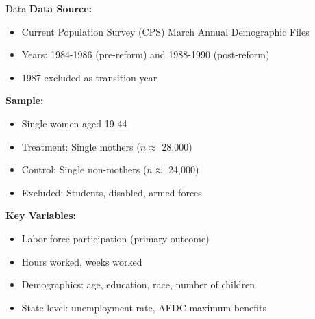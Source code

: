 \documentclass[aspectratio=169]{beamer}
\begin{document}
\begin{frame}{Data}
\textbf{Data Source:}
\begin{itemize}
    \item Current Population Survey (CPS) March Annual Demographic Files
    \item Years: 1984-1986 (pre-reform) and 1988-1990 (post-reform)
    \item 1987 excluded as transition year
\end{itemize}

\vspace{0.3cm}
\textbf{Sample:}
\begin{itemize}
    \item Single women aged 19-44
    \item Treatment: Single mothers ($n \approx$ 28,000)
    \item Control: Single non-mothers ($n \approx$ 24,000)
    \item Excluded: Students, disabled, armed forces
\end{itemize}

\vspace{0.3cm}
\textbf{Key Variables:}
\begin{itemize}
    \item Labor force participation (primary outcome)
    \item Hours worked, weeks worked
    \item Demographics: age, education, race, number of children
    \item State-level: unemployment rate, AFDC maximum benefits
\end{itemize}
\end{frame}
\end{document}
